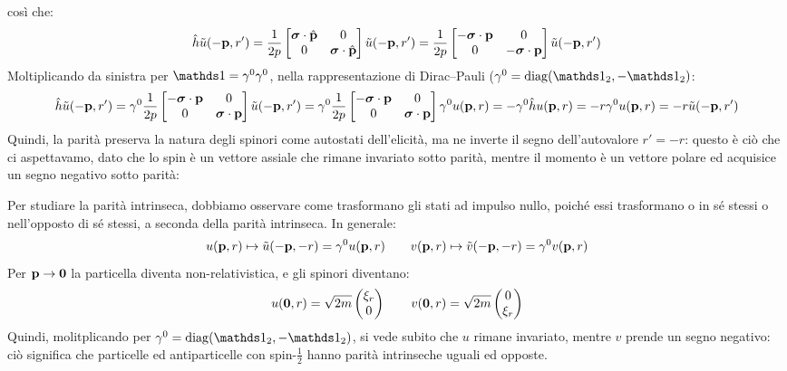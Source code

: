 così che:
\begin{equation*}
  \hat{h} \tilde{u}(-\mathbf{p} , r') = \frac{1}{2p}
  \begin{bmatrix}
    \boldsymbol{\sigma} \cdot \hat{\mathbf{p}} & 0 \\ 0 & \boldsymbol{\sigma} \cdot \hat{\mathbf{p}}
  \end{bmatrix}
  \tilde{u}(-\mathbf{p},r')
  = \frac{1}{2p}
  \begin{bmatrix}
    - \boldsymbol{\sigma} \cdot \mathbf{p} & 0 \\ 0 & - \boldsymbol{\sigma} \cdot \mathbf{p}
  \end{bmatrix}
  \tilde{u}(-\mathbf{p},r')
\end{equation*}
Moltiplicando da sinistra per $ \id = \gamma^0 \gamma^0 $, nella rappresentazione di Dirac--Pauli ($ \gamma^0 = \diag(\id_2 , -\id_2) $:
\begin{equation*}
  \hat{h} \tilde{u}(-\mathbf{p},r') = \gamma^0 \frac{1}{2p}
  \begin{bmatrix}
    - \boldsymbol{\sigma} \cdot \mathbf{p} & 0 \\ 0 & \boldsymbol{\sigma} \cdot \mathbf{p}
  \end{bmatrix}
  \tilde{u}(-\mathbf{p},r')
  = \gamma^0 \frac{1}{2p}
  \begin{bmatrix}
    - \boldsymbol{\sigma} \cdot \mathbf{p} & 0 \\ 0 & \boldsymbol{\sigma} \cdot \mathbf{p}
  \end{bmatrix}
  \gamma^0 u(\mathbf{p},r)
  = - \gamma^0 \hat{h} u(\mathbf{p},r) = - r \gamma^0 u(\mathbf{p},r) = - r \tilde{u}(-\mathbf{p},r')
\end{equation*}
Quindi, la parità preserva la natura degli spinori come autostati dell'elicità, ma ne inverte il segno dell'autovalore $ r' = -r $: questo è ciò che ci aspettavamo, dato che lo spin è un vettore assiale che rimane invariato sotto parità, mentre il momento è un vettore polare ed acquisice un segno negativo sotto parità:

Per studiare la parità intrinseca, dobbiamo osservare come trasformano gli stati ad impulso nullo, poiché essi trasformano o in sé stessi o nell'opposto di sé stessi, a seconda della parità intrinseca. In generale:
\begin{equation*}
  u(\mathbf{p},r) \mapsto \tilde{u}(-\mathbf{p},-r) = \gamma^0 u(\mathbf{p},r)
  \qquad
  v(\mathbf{p},r) \mapsto \tilde{v}(-\mathbf{p},-r) = \gamma^0 v(\mathbf{p},r)
\end{equation*}
Per $ \mathbf{p} \rightarrow \mathbf{0} $ la particella diventa non-relativistica, e gli spinori diventano:
\begin{equation*}
  u(\mathbf{0},r) = \sqrt{2m}
  \begin{pmatrix}
    \xi_r \\ 0
  \end{pmatrix}
  \qquad
  v(\mathbf{0},r) = \sqrt{2m}
  \begin{pmatrix}
    0 \\ \xi_r
  \end{pmatrix}
\end{equation*}
Quindi, molitplicando per $ \gamma^0 = \diag(\id_2 , - \id_2) $, si vede subito che $ u $ rimane invariato, mentre $ v $ prende un segno negativo: ciò significa che particelle ed antiparticelle con spin-$ \frac{1}{2} $ hanno parità intrinseche uguali ed opposte.

